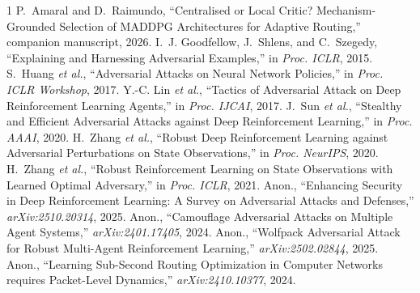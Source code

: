 \documentclass[10pt,journal,comsoc]{IEEEtran}
\begin{document}
\begin{thebibliography}{1}
\small
{} P.~Amaral and D.~Raimundo, ``Centralised or Local Critic?
Mechanism-Grounded Selection of MADDPG Architectures for Adaptive Routing,'' companion
manuscript, 2026.
 I.~J. Goodfellow, J.~Shlens, and C.~Szegedy, ``Explaining and
Harnessing Adversarial Examples,'' in \emph{Proc. ICLR}, 2015.
 S.~Huang \emph{et al.}, ``Adversarial Attacks on Neural
Network Policies,'' in \emph{Proc. ICLR Workshop}, 2017.
 Y.-C. Lin \emph{et al.}, ``Tactics of Adversarial Attack on
Deep Reinforcement Learning Agents,'' in \emph{Proc. IJCAI}, 2017.
 J.~Sun \emph{et al.}, ``Stealthy and Efficient Adversarial
Attacks against Deep Reinforcement Learning,'' in \emph{Proc. AAAI}, 2020.
 H.~Zhang \emph{et al.}, ``Robust Deep Reinforcement Learning
against Adversarial Perturbations on State Observations,'' in \emph{Proc. NeurIPS},
2020.
 H.~Zhang \emph{et al.}, ``Robust Reinforcement Learning on
State Observations with Learned Optimal Adversary,'' in \emph{Proc. ICLR}, 2021.
 Anon., ``Enhancing Security in Deep Reinforcement Learning: A
Survey on Adversarial Attacks and Defenses,'' \emph{arXiv:2510.20314}, 2025.
 Anon., ``Camouflage Adversarial Attacks on Multiple Agent
Systems,'' \emph{arXiv:2401.17405}, 2024.
 Anon., ``Wolfpack Adversarial Attack for Robust Multi-Agent
Reinforcement Learning,'' \emph{arXiv:2502.02844}, 2025.
 Anon., ``Learning Sub-Second Routing Optimization in Computer
Networks requires Packet-Level Dynamics,'' \emph{arXiv:2410.10377}, 2024.
\end{thebibliography}
\end{document}
